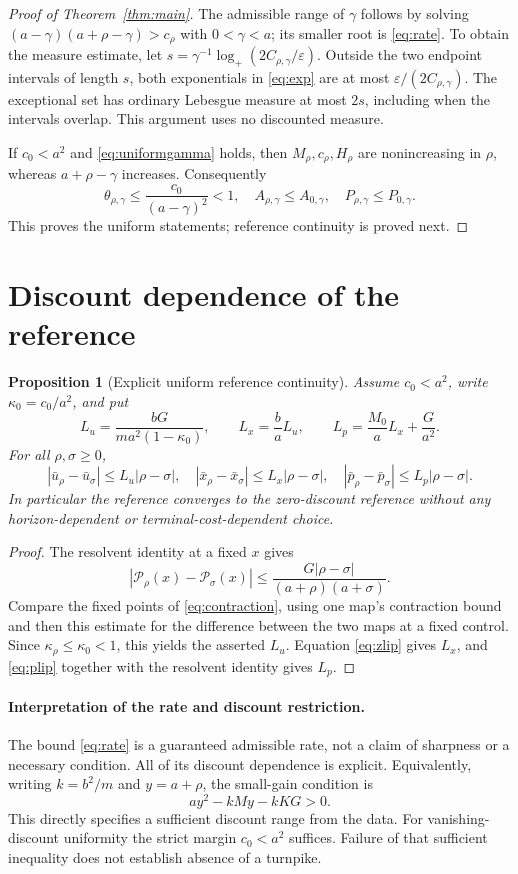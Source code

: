 \documentclass[11pt,a4paper]{article}
\newtheorem{proposition}[theorem]{Proposition}
\newcommand{\logplus}{\log_{+}}
\begin{document}
\begin{proof}[Proof of Theorem~\ref{thm:main}]
The admissible range of $\gamma$ follows by solving
$(a-\gamma)(a+\rho-\gamma)>c_\rho$ with $0<\gamma<a$;
its smaller root is \eqref{eq:rate}. To obtain the measure estimate,
let $s=\gamma^{-1}\logplus(2C_{\rho,\gamma}/\varepsilon)$.
Outside the two endpoint intervals of length $s$, both exponentials in
\eqref{eq:exp} are at most $\varepsilon/(2C_{\rho,\gamma})$.
The exceptional set has ordinary Lebesgue measure at most $2s$,
including when the intervals overlap. This argument uses no discounted
measure.

If $c_0<a^2$ and \eqref{eq:uniformgamma} holds, then $M_\rho,c_\rho,H_\rho$
are nonincreasing in $\rho$, whereas $a+\rho-\gamma$ increases.
Consequently
\[
 \theta_{\rho,\gamma}\leq\frac{c_0}{(a-\gamma)^2}<1,
 \quad A_{\rho,\gamma}\leq A_{0,\gamma},
 \quad P_{\rho,\gamma}\leq P_{0,\gamma}.
\]
This proves the uniform statements; reference continuity is proved next.
\end{proof}

\section{Discount dependence of the reference}
\begin{proposition}[Explicit uniform reference continuity]\label{prop:continuity}
Assume $c_0<a^2$, write $\kappa_0=c_0/a^2$, and put
\[
 L_u=\frac{bG}{m a^2(1-\kappa_0)},\qquad
 L_x=\frac baL_u,\qquad
 L_p=\frac{M_0}{a}L_x+\frac G{a^2}.
\]
For all $\rho,\sigma\geq0$,
\[
 |\bar u_\rho-\bar u_\sigma|\leq L_u|\rho-\sigma|,
 \quad |\bar x_\rho-\bar x_\sigma|\leq L_x|\rho-\sigma|,
 \quad |\bar p_\rho-\bar p_\sigma|\leq L_p|\rho-\sigma|.
\]
In particular the reference converges to the zero-discount reference
without any horizon-dependent or terminal-cost-dependent choice.
\end{proposition}
\begin{proof}
The resolvent identity at a fixed $x$ gives
\[
 |\mathcal P_\rho(x)-\mathcal P_\sigma(x)|
 \leq\frac{G|\rho-\sigma|}{(a+\rho)(a+\sigma)}.
\]
Compare the fixed points of \eqref{eq:contraction}, using one map's
contraction bound and then this estimate for the difference between the
two maps at a fixed control. Since $\kappa_\rho\leq\kappa_0<1$, this yields
the asserted $L_u$. Equation \eqref{eq:zlip} gives $L_x$, and
\eqref{eq:plip} together with the resolvent identity gives $L_p$.
\end{proof}

\paragraph{Interpretation of the rate and discount restriction.}
The bound \eqref{eq:rate} is a guaranteed admissible rate, not a claim of
sharpness or a necessary condition. All of its discount dependence is
explicit. Equivalently, writing $k=b^2/m$ and $y=a+\rho$, the small-gain
condition is
\[
 a y^2-kMy-kKG>0.
\]
This directly specifies a sufficient discount range from the data.
For vanishing-discount uniformity the strict margin $c_0<a^2$ suffices.
Failure of that sufficient inequality does not establish absence of a
turnpike.
\end{document}
